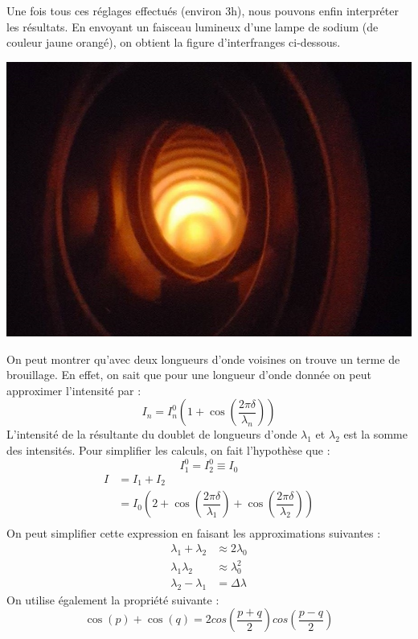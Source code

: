 \documentclass[12pt,a4paper]{article}
\begin{document}
	Une fois tous ces réglages effectués (environ 3h), nous pouvons enfin interpréter les résultats. En envoyant un faisceau lumineux d'une lampe de sodium (de couleur jaune orangé), on obtient la figure d'interfranges ci-dessous.
	\begin{center}
		\includegraphics[scale=0.5]{photo1}
	\end{center}
	On peut montrer qu'avec deux longueurs d'onde voisines on trouve un terme de brouillage. En effet, on sait que pour une longueur d'onde donnée on peut approximer l'intensité par :
	$$I_n = I^{0}_{n} (1+\cos(\dfrac{2\pi\delta}{\lambda_n}))$$
	L'intensité de la résultante du doublet de longueurs d'onde $\lambda_1$ et $\lambda_2$ est la somme des intensités. Pour simplifier les calculs, on fait l'hypothèse que :
	\begin{equation}
	I^{0}_{1}=I^{0}_{2}\equiv I_{0}
	\end{equation}
	\begin{align*}
	I &= I_1 + I_2\\
	&= I_0(2+\cos(\dfrac{2\pi\delta}{\lambda_1})+\cos(\dfrac{2\pi\delta}{\lambda_2}))\\
	\end{align*}
	On peut simplifier cette expression en faisant les approximations suivantes : 
	\begin{align}
	\lambda_1+\lambda_2 &\approx 2\lambda_0\\
	\lambda_1\lambda_2 &\approx \lambda_{0}^2\\
	\lambda_2-\lambda_1 &= \Delta\lambda
	\end{align}
	On utilise également la propriété suivante :
	$$\cos(p) + \cos(q) = 2cos(\frac{p+q}{2})cos(\frac{p-q}{2})$$
\end{document}
